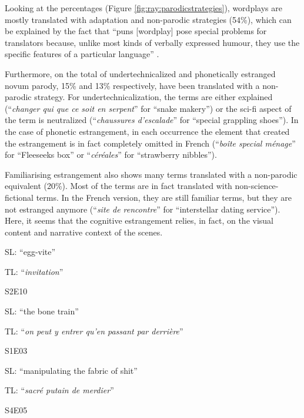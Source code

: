 \documentclass[output=paper]{langscibook}
\begin{document}
Looking at the percentages (Figure \ref{fig:ray:parodicstrategies}), wordplays are mostly translated with adaptation and non-parodic strategies (54\%), which can be explained by the fact that “puns [wordplay] pose special problems for translators because, unlike most kinds of verbally expressed humour, they use the specific features of a particular language” \citep[59]{Low2011}.

Furthermore, on the total of undertechnicalized and phonetically estranged novum parody, 15\% and 13\% respectively, have been translated with a non-parodic strategy. For undertechnicalization, the terms are either explained (“\textit{changer qui que ce soit en serpent}” for “snake makery”) or the sci-fi aspect of the term is neutralized (“\textit{chaussures d’escalade}” for “special grappling shoes”). In the case of phonetic estrangement, in each occurrence the element that created the estrangement is in fact completely omitted in French (“\textit{boîte special ménage}” for “Fleeseeks box” or “\textit{céréales}” for “strawberry nibbles”).

Familiarising estrangement also shows many terms translated with a non-parodic equivalent (20\%). Most of the terms are in fact translated with non-science-fictional terms. In the French version, they are still familiar terms, but they are not estranged anymore (“\textit{site de rencontre}” for “interstellar dating service”). Here, it seems that the cognitive estrangement relies, in fact, on the visual content and narrative context of the scenes.

\ea\label{ex:ray:9} SL: “egg-vite”

TL: “\textit{invitation}”

S2E10
\z

\ea\label{ex:ray:10} SL: “the bone train”

TL: “\textit{on peut y entrer qu’en passant par derrière}”

S1E03
\z

\ea\label{ex:ray:11} SL: “manipulating the fabric of shit”

TL: “\textit{sacré putain de merdier}”

S4E05
\z
\end{document}
